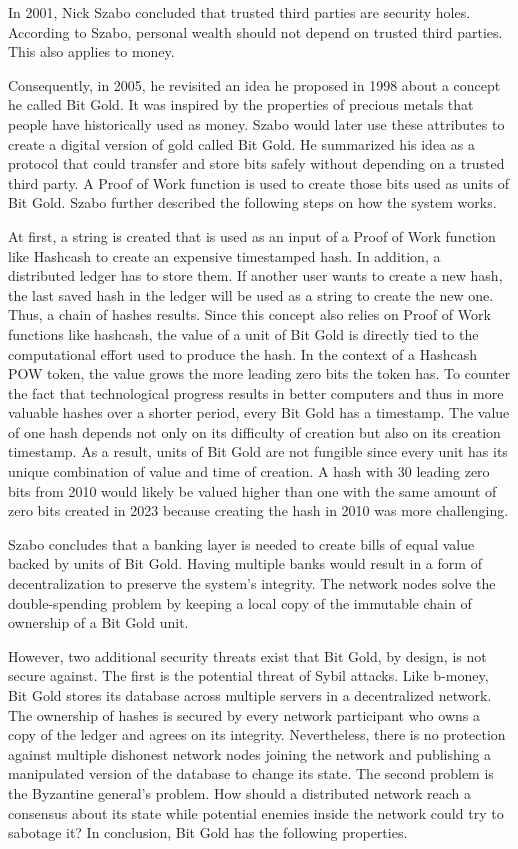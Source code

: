 In 2001, Nick Szabo concluded that trusted third parties are security holes.
According to Szabo, personal wealth should not depend on trusted third parties.
This also applies to money. \cite{szabo2001}

Consequently, in 2005, he revisited an idea he proposed in 1998 about a concept he called Bit Gold.
It was inspired by the properties of precious metals that people have historically used as money.
Szabo would later use these attributes to create a digital version of gold called Bit Gold.
He summarized his idea as a protocol that could transfer and store bits safely without depending on a trusted third party.
A Proof of Work function is used to create those bits used as units of Bit Gold.
Szabo further described the following steps on how the system works.

At first, a string is created that is used as an input of a Proof of Work function like Hashcash \cite{back1997} to create an expensive timestamped hash.
In addition, a distributed ledger has to store them.
If another user wants to create a new hash, the last saved hash in the ledger will be used as a string to create the new one. 
Thus, a chain of hashes results.
Since this concept also relies on Proof of Work functions like hashcash, the value of a unit of Bit Gold is directly tied to the computational effort used to produce the hash.
In the context of a Hashcash POW token, the value grows the more leading zero bits the token has.
To counter the fact that technological progress results in better computers and thus in more valuable hashes over a shorter period, every Bit Gold has a timestamp.
The value of one hash depends not only on its difficulty of creation but also on its creation timestamp.
As a result, units of Bit Gold are not fungible since every unit has its unique combination of value and time of creation.
A hash with 30 leading zero bits from 2010 would likely be valued higher than one with the same amount of zero bits created in 2023 because creating the hash in 2010 was more challenging.

Szabo concludes that a banking layer is needed to create bills of equal value backed by units of Bit Gold.
Having multiple banks would result in a form of decentralization to preserve the system's integrity.
The network nodes solve the double-spending problem by keeping a local copy of the immutable chain of ownership of a Bit Gold unit. \cite{szabo2005}

However, two additional security threats exist that Bit Gold, by design, is not secure against.
The first is the potential threat of Sybil attacks.
Like b-money, Bit Gold stores its database across multiple servers in a decentralized network.
The ownership of hashes is secured by every network participant who owns a copy of the ledger and agrees on its integrity.
Nevertheless, there is no protection against multiple dishonest network nodes joining the network and publishing a manipulated version of the database to change its state.
The second problem is the Byzantine general's problem.
How should a distributed network reach a consensus about its state while potential enemies inside the network could try to sabotage it?
In conclusion, Bit Gold has the following properties. \cite{wirdum_4_2018}

